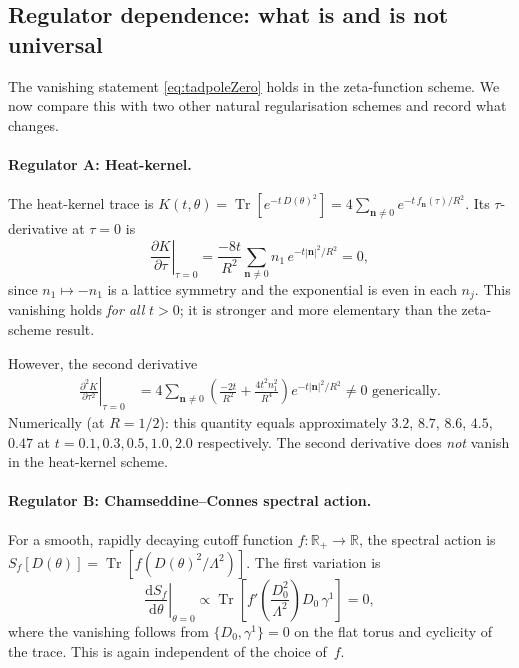 \subsection{Regulator dependence: what is and is not universal}
\label{ssec:regulatorDep}

The vanishing statement \cref{eq:tadpoleZero} holds in the
zeta-function scheme.  We now compare this with two other natural
regularisation schemes and record what changes.

\paragraph{Regulator A: Heat-kernel.}
The heat-kernel trace is
$K(t,\theta) = \operatorname{Tr}[e^{-t\,D(\theta)^2}]
= 4\sum_{\mathbf{n}\neq 0}e^{-t\,f_{\mathbf{n}}(\tau)/R^2}$.
Its $\tau$-derivative at $\tau=0$ is
\[
  \left.\frac{\partial K}{\partial\tau}\right|_{\tau=0}
    = \frac{-8t}{R^2}\sum_{\mathbf{n}\neq 0}
      n_1\,e^{-t|\mathbf{n}|^2/R^2}
    = 0,
\]
since $n_1\mapsto -n_1$ is a lattice symmetry and the exponential is
even in each $n_j$.  This vanishing holds \emph{for all} $t>0$; it is
stronger and more elementary than the zeta-scheme result.

However, the second derivative
\begin{align}
  \left.\frac{\partial^2 K}{\partial\tau^2}\right|_{\tau=0}
    &= 4\sum_{\mathbf{n}\neq 0}
       \!\left(\frac{-2t}{R^2}+\frac{4t^2 n_1^2}{R^4}\right)
       e^{-t|\mathbf{n}|^2/R^2}
     \neq 0 \text{ generically.}
\end{align}
Numerically (at $R=1/2$): this quantity equals approximately $3.2$,
$8.7$, $8.6$, $4.5$, $0.47$ at $t=0.1,0.3,0.5,1.0,2.0$ respectively.
The second derivative does \emph{not} vanish in the heat-kernel scheme.

\paragraph{Regulator B: Chamseddine--Connes spectral action.}
For a smooth, rapidly decaying cutoff function $f\colon\mathbb{R}_+\to\mathbb{R}$,
the spectral action is $S_f[D(\theta)] = \operatorname{Tr}[f(D(\theta)^2/\Lambda^2)]$.
The first variation is
\[
  \left.\frac{\mathrm{d}S_f}{\mathrm{d}\theta}\right|_{\theta=0}
    \propto \operatorname{Tr}\!\left[
      f'\!\left(\frac{D_0^2}{\Lambda^2}\right)D_0\,\gamma^1\right]
    = 0,
\]
where the vanishing follows from $\{D_0,\gamma^1\}=0$ on the flat torus
and cyclicity of the trace.  This is again independent of the choice of~$f$.

